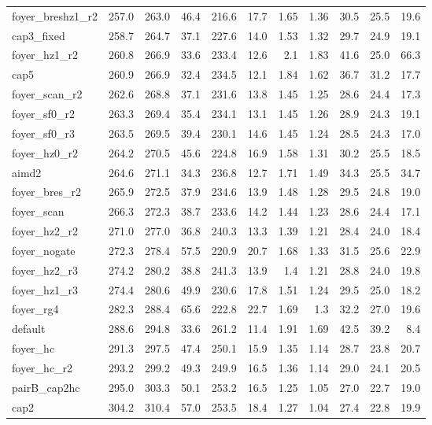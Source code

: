 \documentclass[10pt]{article}
\begin{document}
\begin{landscape}
\begin{center}
\begin{tabular}{lrrrrrrrrrr}
foyer\_breshz1\_r2 & 257.0 & 263.0 & 46.4 & 216.6 & 17.7 & 1.65 & 1.36 & 30.5 & 25.5 & 19.6 \\
cap3\_fixed & 258.7 & 264.7 & 37.1 & 227.6 & 14.0 & 1.53 & 1.32 & 29.7 & 24.9 & 19.1 \\
foyer\_hz1\_r2 & 260.8 & 266.9 & 33.6 & 233.4 & 12.6 & 2.1 & 1.83 & 41.6 & 25.0 & 66.3 \\
cap5 & 260.9 & 266.9 & 32.4 & 234.5 & 12.1 & 1.84 & 1.62 & 36.7 & 31.2 & 17.7 \\
foyer\_scan\_r2 & 262.6 & 268.8 & 37.1 & 231.6 & 13.8 & 1.45 & 1.25 & 28.6 & 24.4 & 17.3 \\
foyer\_sf0\_r2 & 263.3 & 269.4 & 35.4 & 234.1 & 13.1 & 1.45 & 1.26 & 28.9 & 24.3 & 19.1 \\
foyer\_sf0\_r3 & 263.5 & 269.5 & 39.4 & 230.1 & 14.6 & 1.45 & 1.24 & 28.5 & 24.3 & 17.0 \\
foyer\_hz0\_r2 & 264.2 & 270.5 & 45.6 & 224.8 & 16.9 & 1.58 & 1.31 & 30.2 & 25.5 & 18.5 \\
aimd2 & 264.6 & 271.1 & 34.3 & 236.8 & 12.7 & 1.71 & 1.49 & 34.3 & 25.5 & 34.7 \\
foyer\_bres\_r2 & 265.9 & 272.5 & 37.9 & 234.6 & 13.9 & 1.48 & 1.28 & 29.5 & 24.8 & 19.0 \\
foyer\_scan & 266.3 & 272.3 & 38.7 & 233.6 & 14.2 & 1.44 & 1.23 & 28.6 & 24.4 & 17.1 \\
foyer\_hz2\_r2 & 271.0 & 277.0 & 36.8 & 240.3 & 13.3 & 1.39 & 1.21 & 28.4 & 24.0 & 18.4 \\
foyer\_nogate & 272.3 & 278.4 & 57.5 & 220.9 & 20.7 & 1.68 & 1.33 & 31.5 & 25.6 & 22.9 \\
foyer\_hz2\_r3 & 274.2 & 280.2 & 38.8 & 241.3 & 13.9 & 1.4 & 1.21 & 28.8 & 24.0 & 19.8 \\
foyer\_hz1\_r3 & 274.4 & 280.6 & 49.9 & 230.6 & 17.8 & 1.51 & 1.24 & 29.5 & 25.0 & 18.2 \\
foyer\_rg4 & 282.3 & 288.4 & 65.6 & 222.8 & 22.7 & 1.69 & 1.3 & 32.2 & 27.0 & 19.6 \\
default & 288.6 & 294.8 & 33.6 & 261.2 & 11.4 & 1.91 & 1.69 & 42.5 & 39.2 & 8.4 \\
foyer\_hc & 291.3 & 297.5 & 47.4 & 250.1 & 15.9 & 1.35 & 1.14 & 28.7 & 23.8 & 20.7 \\
foyer\_hc\_r2 & 293.2 & 299.2 & 49.3 & 249.9 & 16.5 & 1.36 & 1.14 & 29.0 & 24.1 & 20.5 \\
pairB\_cap2hc & 295.0 & 303.3 & 50.1 & 253.2 & 16.5 & 1.25 & 1.05 & 27.0 & 22.7 & 19.0 \\
cap2 & 304.2 & 310.4 & 57.0 & 253.5 & 18.4 & 1.27 & 1.04 & 27.4 & 22.8 & 19.9 \\

\end{tabular}
\end{center}
\end{landscape}
\end{document}

